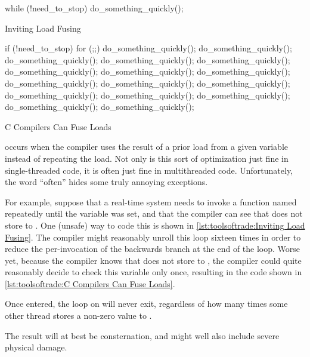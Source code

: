\begin{description}[labelsep=.4em]
\begin{listing}
\begin{fcvlabel}
\begin{VerbatimLL}[commandchars=\\\{\}]
while (!need_to_stop)
	do_something_quickly();
\end{VerbatimLL}
\end{fcvlabel}
\caption{Inviting Load Fusing}
\label{lst:toolsoftrade:Inviting Load Fusing}
\end{listing}

\begin{listing}
\begin{fcvlabel}
\begin{VerbatimLL}[commandchars=\\\[\]]
if (!need_to_stop)
	for (;;) {\lnlbl[loop:b]
		do_something_quickly();
		do_something_quickly();
		do_something_quickly();
		do_something_quickly();
		do_something_quickly();
		do_something_quickly();
		do_something_quickly();
		do_something_quickly();
		do_something_quickly();
		do_something_quickly();
		do_something_quickly();
		do_something_quickly();
		do_something_quickly();
		do_something_quickly();
		do_something_quickly();
		do_something_quickly();
	}\lnlbl[loop:e]
\end{VerbatimLL}
\end{fcvlabel}
\caption{C Compilers Can Fuse Loads}
\label{lst:toolsoftrade:C Compilers Can Fuse Loads}
\end{listing}

\item[Load fusing] occurs when the compiler uses the result of a
prior load from a given variable instead of repeating the load.
Not only is this sort of optimization just fine in single-threaded
code, it is often just fine in multithreaded code.
Unfortunately, the word ``often'' hides some truly annoying exceptions.

For example, suppose that a real-time system needs to invoke a
function named  repeatedly until the
variable  was set, and that the compiler can see
that  does not store to .
One (unsafe) way to code this is shown in
\cref{lst:toolsoftrade:Inviting Load Fusing}.
The compiler might reasonably unroll this loop sixteen times in order
to reduce the per-invocation of the backwards branch at the end of the
loop.
Worse yet, because the compiler knows that 
does not store to , the compiler could quite reasonably
decide to check this variable only once, resulting in the code shown in
\cref{lst:toolsoftrade:C Compilers Can Fuse Loads}.
\begin{fcvref}
Once entered, the loop on
 will never exit, regardless of how
many times some other thread stores a non-zero value to .
\end{fcvref}
The result will at best be consternation, and might well also
include severe physical damage.


\end{description}
